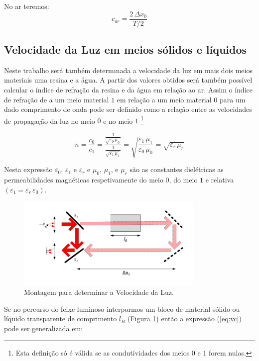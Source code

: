 \documentclass[a4paper,12pt]{article}      %
\begin{document}
No ar teremos:
\begin{equation}
	\label{eq:vc}
	c_{ar} = \frac{2\,\Delta x_0}{T/2} 
\end{equation}

\subsection{\sf Velocidade da Luz em meios sólidos e líquidos}
Neste trabalho será também determınada a velocidade da
luz em  mais dois meios materiais uma resina e a água. 
A partir dos valores obtidos 
será também possível calcular o índice de refração da resina e da água em
relação ao ar. Assim o índice de refração de
a um meio material $1$ em relação a um meio material $0$
 para um dado comprimento de onda pode ser definido como a relação entre as velocidades de propagação da luz no meio 
 $0$ e no meio $1$ \footnote{Esta definição só é válida se as condutividades dos meios $0$ e $1$ forem nulas.}
 
 
 \begin{equation}
	\label{eq:index}
	n= \frac{c_0}{c_1}  = \frac{\frac{1}{\sqrt{\varepsilon_0 \, \mu_0}} }{\frac{1}{\sqrt{\varepsilon_1 \, \mu_1}} } =
		\sqrt{\frac{\varepsilon_1 \, \mu_1}{\varepsilon_0 \, \mu_0}} = \sqrt{\varepsilon_r \, \mu_r}
\end{equation}

Nesta expressão $\varepsilon_0$, $\varepsilon_1$ e $\varepsilon_r$   e  $\mu_0$, $\mu_1$, e $\mu_r$ são as constantes dielétricas  as permeabilidades magnéticas respetivamente do meio $0$, do meio $1$ e relativa $(\varepsilon_1= \varepsilon_r\, \varepsilon_0)$.

\begin{figure}[h!tb]  
	\centering 
	\includegraphics[width=0.8\textwidth]{Vel_esquema_bloco}
	\caption{Montagem para determinar a Velocidade da Luz. \label{fig:Montagem_bloco}} 
\end{figure}

Se no percurso do feixe luminoso interpormos um bloco de material sólido ou líquido transparente 
 de comprimento $l_B$ (Figura \ref{fig:Montagem_bloco}) então a expressão  (\ref{eq:vc}) pode ser generalizada em:
\end{document}
